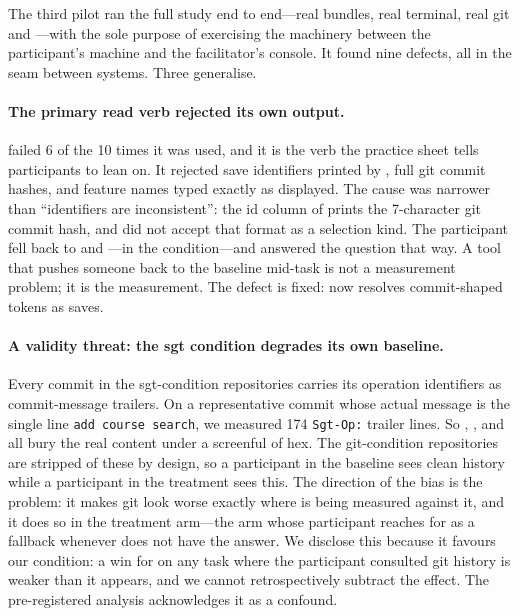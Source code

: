 The third pilot ran the full study end to end---real bundles, real terminal, real
git and \sgt{}---with the sole purpose of exercising the machinery between the
participant's machine and the facilitator's console. It found nine defects, all
in the seam between systems. Three generalise.

\paragraph{The primary read verb rejected its own output.}
 failed 6 of the 10 times it was used, and it is the verb the
practice sheet tells participants to lean on. It rejected save identifiers printed
by , full git commit hashes, and feature names typed exactly as
displayed. The cause was narrower than ``identifiers are inconsistent'': the id
column of  prints the 7-character git commit hash, and 
did not accept that format as a selection kind. The participant fell back to
 and ---in the \sgt{} condition---and
answered the question that way. A tool that pushes someone back to the baseline
mid-task is not a measurement problem; it is the measurement. The defect is
fixed:  now resolves commit-shaped tokens as saves.

\paragraph{A validity threat: the sgt condition degrades its own baseline.}
\label{sec:pilot-trailers}
Every commit in the sgt-condition repositories carries its operation identifiers
as commit-message trailers. On a representative commit whose actual message is
the single line \texttt{add course search}, we measured 174 \texttt{Sgt-Op:}
trailer lines. So , , and  all bury
the real content under a screenful of hex. The git-condition repositories are
stripped of these by design, so a participant in the baseline sees clean history
while a participant in the treatment sees this. The direction of the bias is the
problem: it makes git look worse exactly where \sgt{} is being measured against
it, and it does so in the treatment arm---the arm whose participant reaches for
 as a fallback whenever \sgt{} does not have the answer. We
disclose this because it favours our condition: a win for \sgt{} on any task
where the participant consulted git history is weaker than it appears, and we
cannot retrospectively subtract the effect. The pre-registered analysis
acknowledges it as a confound.

